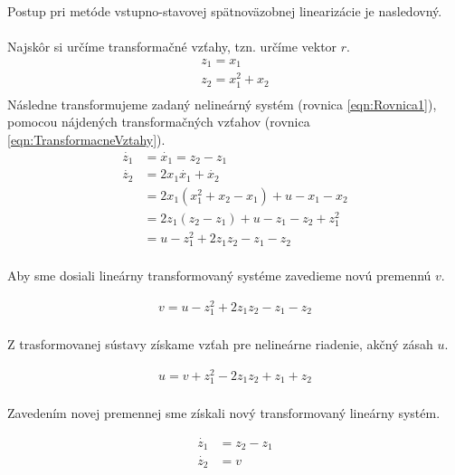 \documentclass[../main.tex]{subfiles}
\begin{document}
Postup pri metóde vstupno-stavovej spätnoväzobnej linearizácie je nasledovný.\\\\
Najskôr si určíme transformačné vzťahy, tzn. určíme vektor $r$.
\begin{equation}
	\begin{gathered}
		z_1  = x_1 \\
		z_2 = x_1^2 + x_2 \\
	\end{gathered}
	\label{eqn:TransformacneVztahy}
\end{equation}
Následne transformujeme zadaný nelineárný systém (rovnica \ref{eqn:Rovnica1}), pomocou nájdených transformačných vzťahov (rovnica \ref{eqn:TransformacneVztahy}).
\begin{equation}
	\begin{split}
	\dot{z_1}  & = \dot{x_1} = z_2 - z_1 \\
	\dot{z_2} & = 2x_1\dot{x_1} + \dot{x_2} \\
	 & = 2x_1(x_1^2 + x_2 - x_1) + u - x_1 - x_2 \\
	 & = 2z_1(z_2 - z_1) + u - z_1 - z_2 + z_1^2\\
	 & = u - z_1^2 + 2z_1z_2 - z_1 - z_2 \\
	\end{split}
	\label{eqn:TransformovanySystem}
\end{equation}

Aby sme dosiali lineárny transformovaný systéme zavedieme novú premennú $v$.

\begin{equation}
	\begin{split}
	 v = u - z_1^2 + 2z_1z_2 - z_1 - z_2 \\
	\end{split}
	\label{eqn:SubsV}
\end{equation}

Z trasformovanej sústavy získame vzťah pre nelineárne riadenie, akčný zásah $u$.

\begin{equation}
	\begin{gathered}
		u = v + z_1^2 - 2z_1z_2 + z_1 + z_2\\
	\end{gathered}
	\label{eqn:Noveu}
\end{equation}

Zavedením novej premennej sme získali nový transformovaný lineárny systém.

\begin{equation}
	\begin{split}
	\dot{z_1}  & = z_2 - z_1 \\
	 \dot{z_2} & = v \\
	\end{split}
	\label{eqn:TransformovanySystem}
\end{equation}
\end{document}
